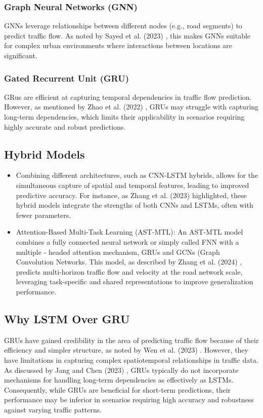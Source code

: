 \documentclass[conference]{IEEEtran}
\begin{document}
\subsubsection{Graph Neural Networks (GNN)}
GNNs leverage relationships between different nodes (e.g., road segments) to predict traffic flow. As noted by Sayed et al. (2023) \cite{ppr1}, this makes GNNs suitable for complex urban environments where interactions between locations are significant.

\subsubsection{Gated Recurrent Unit (GRU)}
GRus are efficient at capturing temporal dependencies in traffic flow prediction. However, as mentioned by Zhao et al. (2022) \cite{ppr21}, GRUs may struggle with capturing long-term dependencies, which limits their applicability in scenarios requiring highly accurate and robust predictions.

\subsection{Hybrid Models}

\begin{itemize}
    \item Combining different architectures, such as CNN-LSTM hybrids, allows for the simultaneous capture of spatial and temporal features, leading to improved predictive accuracy. For instance, as Zhang et al. (2023) \cite{ppr16} highlighted, these hybrid models integrate the strengths of both CNNs and LSTMs, often with fewer parameters.
    \item Attention-Based Multi-Task Learning (AST-MTL): An AST-MTL model combines a fully connected neural network or simply called FNN with a multiple - headed attention mechanism, GRUs and GCNs (Graph Convolution Networks. This model, as described by Zhang et al. (2024) \cite{ppr24}, predicts multi-horizon traffic flow and velocity at the road network scale, leveraging task-specific and shared representations to improve generalization performance.
\end{itemize}

\subsection{Why LSTM Over GRU}

GRUs have gained credibility in the area of predicting traffic flow because of their efficiency and simpler structure, as noted by Wen et al. (2023) \cite{ppr19}. However, they have limitations in capturing complex spatiotemporal relationships in traffic data. As discussed by Jang and Chen (2023) \cite{ppr22}, GRUs typically do not incorporate mechanisms for handling long-term dependencies as effectively as LSTMs. Consequently, while GRUs are beneficial for short-term predictions, their performance may be inferior in scenarios requiring high accuracy and robustness against varying traffic patterns.
\end{document}
